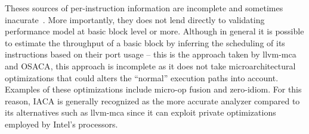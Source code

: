 Theses sources of per-instruction information are incomplete and sometimes inacurate~\cite{uops}. 
More importantly, they does not lend directly to validating performance model at basic block level or more.
Although in general it is possible to estimate the throughput of 
a basic block by inferring the scheduling of its instructions based on their
port usage -- this is the approach taken by llvm-mca and OSACA\cite{osaca},
this approach is incomplete as it does not take microarchitectural
optimizations that could alters the ``normal'' execution paths into account. 
Examples of these optimizations include micro-op fusion and zero-idiom.
For this reason, IACA\cite{iaca} is generally recognized as the more accurate analyzer
compared to its alternatives such as llvm-mca since it can exploit
private optimizations employed by Intel's processors.


